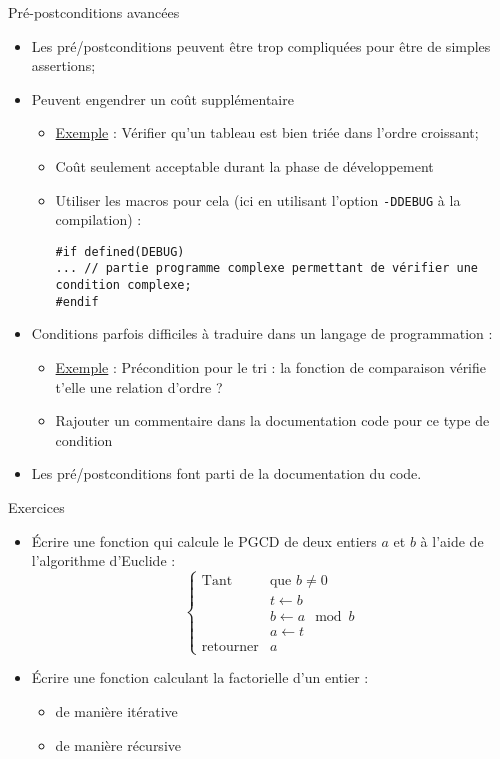 \documentclass[compress,10pt,aspectratio=169]{beamer}
\begin{document}
\begin{frame}[fragile]{Pré-postconditions avancées}
\scriptsize 
\begin{itemize}
\item Les pré/postconditions peuvent être trop compliquées pour être de simples assertions;
\item Peuvent engendrer un coût supplémentaire
\begin{itemize}
\scriptsize 
\item \underline{Exemple} : Vérifier qu'un tableau est bien triée dans l'ordre croissant;
\item Coût seulement acceptable durant la phase de développement
\item Utiliser les macros pour cela (ici en utilisant l'option \texttt{-DDEBUG} à la compilation) :
\begin{verbatim}
#if defined(DEBUG)
... // partie programme complexe permettant de vérifier une condition complexe;
#endif
\end{verbatim}
\end{itemize}
\item Conditions parfois difficiles à traduire dans un langage de programmation :
\begin{itemize}
\scriptsize 
\item \underline{Exemple} : Précondition pour le tri : la fonction de comparaison vérifie t'elle une relation d'ordre ?
\item Rajouter un commentaire dans la documentation code pour ce type de condition
\end{itemize}
\item Les pré/postconditions font parti de la documentation du code.
\end{itemize}
\end{frame}

\begin{frame}[fragile]{Exercices}
\scriptsize 
\begin{itemize}
\item \'Ecrire une fonction qui calcule le PGCD de deux entiers $a$ et $b$ à l'aide de l'algorithme d'Euclide :
\[
\left\{\begin{array}{ll}
\mbox{Tant} & \mbox{que } b \neq 0\\
 & t \leftarrow b \\
&  b \leftarrow a\mod b \\
&  a \leftarrow t\\
\mbox{retourner} & a 
\end{array}\right.
\]
\item \'Ecrire une fonction calculant la factorielle d'un entier :
\begin{itemize}
    \scriptsize
\item de manière itérative
\item de manière récursive
\end{itemize}
\end{itemize}
\end{frame}
\end{document}
